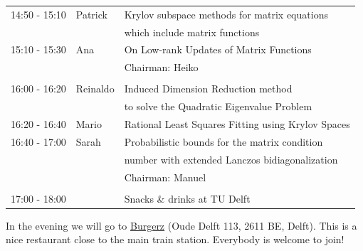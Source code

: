 \documentclass{article}
\begin{document}
\begin{table}[h]
\begin{tabular}{lll}
14:50 - 15:10 & Patrick & Krylov subspace methods for matrix equations \\
                  & & which include matrix functions\\ [0.5ex]
15:10 - 15:30 & Ana & On Low-rank Updates of Matrix Functions\\ [0.5ex]
& & \hfill \small{Chairman: Heiko}  \\
\hline \\ [-1.5ex]
16:00 - 16:20 & Reinaldo & Induced Dimension Reduction method \\
            & & to solve the Quadratic Eigenvalue Problem \\ [0.5ex]
16:20 - 16:40 & Mario & Rational Least Squares Fitting using Krylov Spaces\\ [0.5ex]
16:40 - 17:00 & Sarah & Probabilistic bounds for the matrix condition  \\
                    & & number with extended Lanczos bidiagonalization\\ [0.5ex]
& & \hfill \small{Chairman: Manuel}\\
\hline \\ [-1.5ex]
17:00 - 18:00 & & Snacks \& drinks at TU Delft
\end{tabular}
\end{table}

In the evening we will go to \href{http://www.burgerz.nl/en/contact/delft}{Burgerz} (Oude Delft 113, 2611 BE, Delft). This is a nice restaurant close to the main train station. Everybody is welcome to join!
\end{document}
